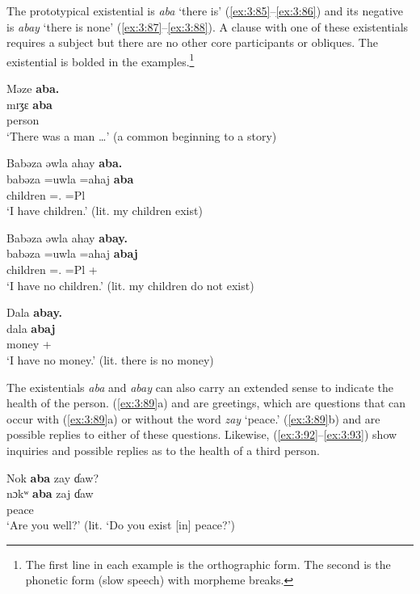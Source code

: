 The prototypical existential is \textit{aba} ‘there is’ (\ref{ex:3:85}--\ref{ex:3:86}) and its negative is \textit{abay} ‘there is none’ (\ref{ex:3:87}--\ref{ex:3:88}). A clause with one of these existentials requires a subject but there are no other core participants or obliques. The existential is bolded in the examples.\footnote{The first line in each example is the orthographic form. The second is the phonetic form (slow speech) with morpheme breaks.} 

\ea \label{ex:3:85}
{Məze}  \textbf{aba.}\\
\gll mɪʒɛ \textbf{aba} \\
      person  {\EXT}\\
\glt ‘There was a man \ldots' (a common beginning to a story)
\z

\ea \label{ex:3:86}
Babəza  əwla  ahay  \textbf{aba.}\\
\gll  babəza   =uwla    =ahaj  \textbf{aba}\\
      children  ={\oneS}.{\POSS}  =Pl  {\EXT}\\
\glt  ‘I have children.’ (lit. my children exist)
\z

\ea \label{ex:3:87}
Babəza  əwla  ahay  \textbf{abay.}\\
\gll  babəza  =uwla    =ahaj  \textbf{abaj}\\
      children  ={\oneS}.{\POSS}  =Pl  {\EXT}+{\NEG}\\
\glt  ‘I have no children.’  (lit. my children do not exist)
\z

\ea \label{ex:3:88}
Dala  \textbf{abay.}\\
\gll  dala    \textbf{abaj}\\
      money  {\EXT}+{\NEG}\\
\glt  ‘I have no money.’ (lit. there is no money)
\z

The existentials \textit{aba} and \textit{abay} can also carry an extended sense to indicate the health of the person. (\ref{ex:3:89}a) and  are greetings, which are questions that can occur with (\ref{ex:3:89}a) or without  the word \textit{zay} ‘peace.’ (\ref{ex:3:89}b) and  are possible replies to either of these questions. Likewise, (\ref{ex:3:92}--\ref{ex:3:93}) show inquiries and possible replies as to the health of a third person.

\ea \label{ex:3:89}
\ea Nok \textbf{aba} zay ɗaw? \\
\gll nɔkʷ  \textbf{aba}    zaj  ɗaw        \\
      {\twoS}    {\EXT}    peace  {\QUEST}       \\
\glt  ‘Are you well?’ (lit. ‘Do you exist [in] peace?’)\\

